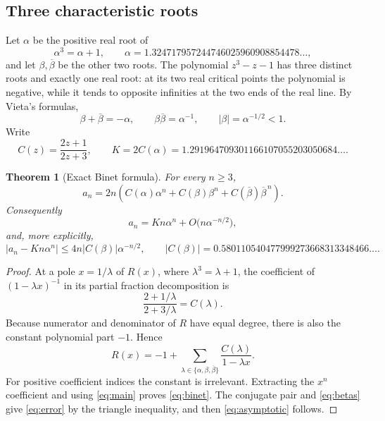 \documentclass[11pt,letterpaper]{article}
\numberwithin{equation}{section}
\newtheorem{theorem}{Theorem}[section]
\theoremstyle{definition}
\newcommand{\1}{\mathbf 1}
\begin{document}
\subsection{Three characteristic roots}
Let $\alpha$ be the positive real root of
\begin{equation}\label{eq:plastic}
 \alpha^3=\alpha+1,
 \qquad\alpha=1.324717957244746025960908854478\ldots,
\end{equation}
and let $\beta,\overline\beta$ be the other two roots. The polynomial
$z^3-z-1$ has three distinct roots and exactly one real root: at its two real
critical points the polynomial is negative, while it tends to opposite
infinities at the two ends of the real line. By Vieta's formulas,
\begin{equation}\label{eq:betas}
 \beta+\overline\beta=-\alpha,\qquad
 \beta\overline\beta=\alpha^{-1},\qquad
 |\beta|=\alpha^{-1/2}<1.
\end{equation}
Write
\begin{equation}\label{eq:C}
 C(z)=\frac{2z+1}{2z+3},\qquad
 K=2C(\alpha)=1.291964709301166107055203050684\ldots.
\end{equation}

\begin{theorem}[Exact Binet formula]\label{thm:binet}
For every $n\ge3$,
\begin{equation}\label{eq:binet}
 a_n=2n\left(C(\alpha)\alpha^n+C(\beta)\beta^n+
                 C(\overline\beta)\overline\beta^{\,n}\right).
\end{equation}
Consequently
\begin{equation}\label{eq:asymptotic}
 a_n=Kn\alpha^n+O\bigl(n\alpha^{-n/2}\bigr),
\end{equation}
and, more explicitly,
\begin{equation}\label{eq:error}
 |a_n-Kn\alpha^n|\le4n|C(\beta)|\alpha^{-n/2},
 \qquad |C(\beta)|=0.580110540477999273668313348466\ldots.
\end{equation}
\end{theorem}
\begin{proof}
At a pole $x=1/\lambda$ of $R(x)$, where $\lambda^3=\lambda+1$, the coefficient
of $(1-\lambda x)^{-1}$ in its partial fraction decomposition is
\[
 \frac{2+1/\lambda}{2+3/\lambda}=C(\lambda).
\]
Because numerator and denominator of $R$ have equal degree, there is also the
constant polynomial part $-1$. Hence
\begin{equation}\label{eq:partialfraction}
 R(x)=-1+\sum_{\lambda\in\{\alpha,\beta,\overline\beta\}}
                \frac{C(\lambda)}{1-\lambda x}.
\end{equation}
For positive coefficient indices the constant is irrelevant. Extracting the
$x^n$ coefficient and using \eqref{eq:main} proves \eqref{eq:binet}.
The conjugate pair and \eqref{eq:betas} give \eqref{eq:error} by the triangle
inequality, and then \eqref{eq:asymptotic} follows.
\end{proof}
\end{document}
